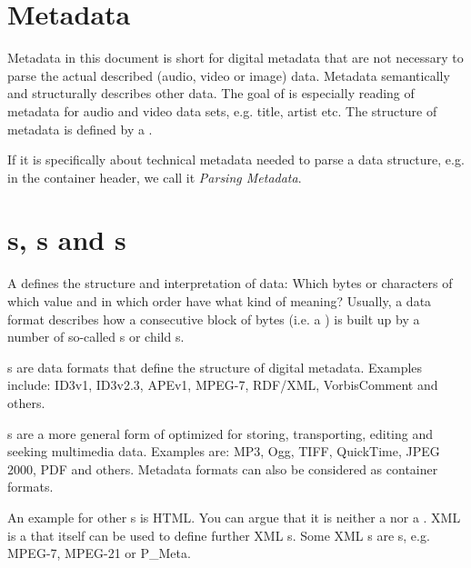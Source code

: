 \section{Metadata}
\label{sec:Metadata}

Metadata in this document is short for digital metadata that are not necessary to parse the actual described (audio, video or image) data. Metadata semantically and structurally describes other data. The goal of \LibName{} is especially reading of metadata for audio and video data sets, e.g. title, artist etc. The structure of metadata is defined by a \TERMmetadataFormat{}.

If it is specifically about technical metadata needed to parse a data structure, e.g. in the container header, we call it \emph{Parsing Metadata}.


\section{\TERMdataFormat{}s, \TERMmetadataFormat{}s and \TERMcontainerFormat{}s}
\label{sec:DataFormats}

A \TERMdataFormat{} defines the structure and interpretation of data: Which bytes or characters of which value and in which order have what kind of meaning?
Usually, a data format describes how a consecutive block of bytes (i.e. a \TERMdataBlock{}) is built up by a number of so-called \TERMfield{}s or child \TERMdataBlock{}s.

\TERMmetadataFormat{}s are data formats that define the structure of digital metadata. Examples include: ID3v1, ID3v2.3, APEv1, MPEG-7, RDF/XML, VorbisComment and others.

\TERMcontainerFormat{}s are a more general form of \TERMdataFormat{} optimized for storing, transporting, editing and seeking multimedia \TERMpayload{} data. Examples are: MP3, Ogg, TIFF, QuickTime, JPEG 2000, PDF and others. Metadata formats can also be considered as container formats.

An example for other \TERMdataFormat{}s is HTML. You can argue that it is neither a \TERMmetadataFormat{} nor a \TERMcontainerFormat{}. XML is a \TERMdataFormat{} that itself can be used to define further XML \TERMdataFormat{}s. Some XML \TERMdataFormat{}s are \TERMmetadataFormat{}s, e.g. MPEG-7, MPEG-21 or P\_Meta.


